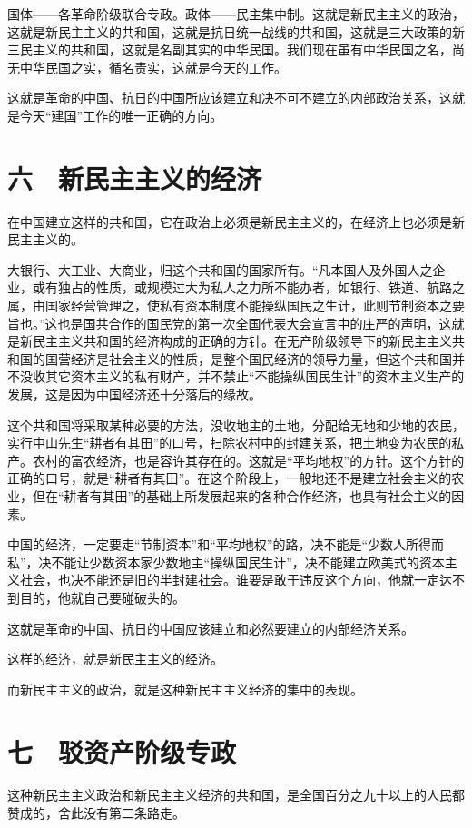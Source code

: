 国体——各革命阶级联合专政。政体——民主集中制。这就是新民主主义的政治，这就是新民主主义的共和国，这就是抗日统一战线的共和国，这就是三大政策的新三民主义的共和国，这就是名副其实的中华民国。我们现在虽有中华民国之名，尚无中华民国之实，循名责实，这就是今天的工作。

这就是革命的中国、抗日的中国所应该建立和决不可不建立的内部政治关系，这就是今天“建国”工作的唯一正确的方向。

\section{六　新民主主义的经济}

在中国建立这样的共和国，它在政治上必须是新民主主义的，在经济上也必须是新民主主义的。

大银行、大工业、大商业，归这个共和国的国家所有。“凡本国人及外国人之企业，或有独占的性质，或规模过大为私人之力所不能办者，如银行、铁道、航路之属，由国家经营管理之，使私有资本制度不能操纵国民之生计，此则节制资本之要旨也。”这也是国共合作的国民党的第一次全国代表大会宣言中的庄严的声明，这就是新民主主义共和国的经济构成的正确的方针。在无产阶级领导下的新民主主义共和国的国营经济是社会主义的性质，是整个国民经济的领导力量，但这个共和国并不没收其它资本主义的私有财产，并不禁止“不能操纵国民生计”的资本主义生产的发展，这是因为中国经济还十分落后的缘故。

这个共和国将采取某种必要的方法，没收地主的土地，分配给无地和少地的农民，实行中山先生“耕者有其田”的口号，扫除农村中的封建关系，把土地变为农民的私产。农村的富农经济，也是容许其存在的。这就是“平均地权”的方针。这个方针的正确的口号，就是“耕者有其田”。在这个阶段上，一般地还不是建立社会主义的农业，但在“耕者有其田”的基础上所发展起来的各种合作经济，也具有社会主义的因素。

中国的经济，一定要走“节制资本”和“平均地权”的路，决不能是“少数人所得而私”，决不能让少数资本家少数地主“操纵国民生计”，决不能建立欧美式的资本主义社会，也决不能还是旧的半封建社会。谁要是敢于违反这个方向，他就一定达不到目的，他就自己要碰破头的。

这就是革命的中国、抗日的中国应该建立和必然要建立的内部经济关系。

这样的经济，就是新民主主义的经济。

而新民主主义的政治，就是这种新民主主义经济的集中的表现。

\section{七　驳资产阶级专政}

这种新民主主义政治和新民主主义经济的共和国，是全国百分之九十以上的人民都赞成的，舍此没有第二条路走。

